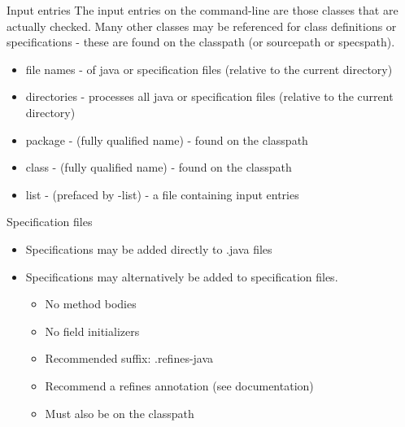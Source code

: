 \documentclass[
pdf,
nocolorBG,
slideColor,
cok,
]{prosper}
\begin{document}


\begin{slide}{Input entries}
\vspace*{-6ex}
The input entries on the command-line are those classes that are actually checked.
Many other classes may be referenced for class definitions or specifications - these are found on the classpath (or sourcepath or specspath).

\begin{itemize}
\item {\knalblue file names} - of java or specification files (relative to the current directory)
\item {\knalblue directories} - processes all java or specification files (relative to the current directory)
\item {\knalblue package} - (fully qualified name) - found on the classpath
\item {\knalblue class} - (fully qualified name) - found on the classpath
\item {\knalblue list} - (prefaced by {\green -list}) - a file containing input entries
\end{itemize}
\end{slide}


\begin{slide}{Specification files}
\vspace*{-6ex}
\begin{itemize}
\item Specifications may be added directly to .java files
\item Specifications may alternatively be added to specification files.
\begin{itemize}
\item No method bodies
\item No field initializers
\item Recommended suffix: {\blue .refines-java}
\item Recommend a {\blue refines} annotation (see documentation)
\item Must also be on the classpath
\end{itemize}
\end{itemize}
\end{slide}

\end{document}
